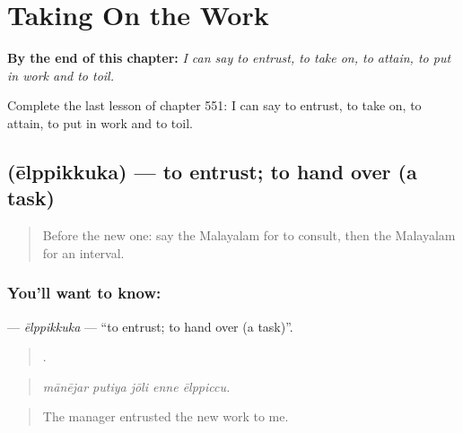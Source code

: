 
\chapter{Taking On the Work}
\label{ch:ml-taking-on-the-work}

\begin{chapteropening}
\textbf{By the end of this chapter:} \emph{I can say to entrust, to take on, to attain, to put in work and to toil.}

Complete the last lesson of chapter 551: I can say to entrust, to take on, to attain, to put in work and to toil.
\end{chapteropening}

\section[\texorpdfstring{\ml{ഏൽപ്പിക്കുക} (ēlppikkuka)}{ഏൽപ്പിക്കുക (ēlppikkuka)}]{ (ēlppikkuka) — to entrust; to hand over (a task)}

\label{lesson:ML-C551-elppikkuka}



\begin{quote}
Before the new one: say the Malayalam for to consult, then the Malayalam for an interval.
\end{quote}

\subsection*{You'll want to know: }
\textbf{} — \emph{ēlppikkuka} — \textquotedblleft{}to entrust; to hand over (a task)\textquotedblright{}.

\begin{quote}
    .
\end{quote}

\begin{quote}
\emph{mānējar putiya jōli enne ēlppiccu.}
\end{quote}

\begin{quote}
The manager entrusted the new work to me.
\end{quote}

